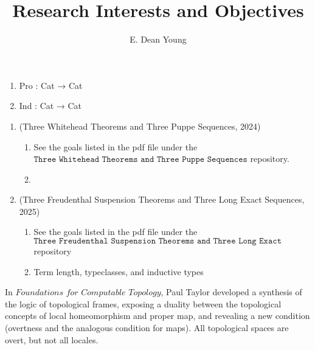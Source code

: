 \documentclass{book}
\title{Research Interests and Objectives}
\author{E. Dean Young}
\begin{document}
\maketitle


\begin{center}
\scalebox{1.3}{\bf Stage 0: (Category Theory)}
\end{center}

\begin{enumerate}
\item Pro : Cat → Cat
\item Ind : Cat → Cat
\end{enumerate}

\newpage
\begin{center}
\end{center}

\begin{enumerate}
\item (Three Whitehead Theorems and Three Puppe Sequences, 2024)
\begin{enumerate}
\item See the goals listed in the pdf file under the $\texttt{Three Whitehead Theorems and Three Puppe Sequences}$ repository.
\item 
\end{enumerate}
\item (Three Freudenthal Suspension Theorems and Three Long Exact Sequences, 2025)
\begin{enumerate}
\item See the goals listed in the pdf file under the $\texttt{Three Freudenthal Suspension Theorems and Three Long Exact Sequences}$ repository 
\item Term length, typeclasses, and inductive types
\end{enumerate}
\end{enumerate}

\iffalse

\newpage
\begin{center}
\end{center}


In $\textit{Foundations for Computable Topology}$, Paul Taylor developed a synthesis of the logic of topological frames, exposing a duality between the topological concepts of local homeomorphism and proper map, and revealing a new condition (overtness and the analogous condition for maps). All topological spaces are overt, but not all locales.\\
\end{document}
